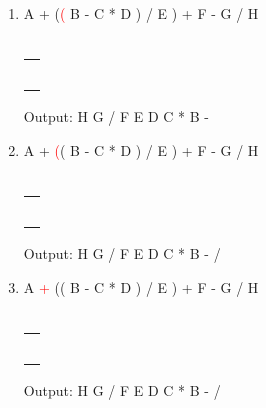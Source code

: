 \documentclass[a4paper]{article}
\begin{document}
\begin{large}
\begin{enumerate}
          \renewcommand{\arraystretch}{1.3} \item
          A + (\textcolor{red}{(} B - C * D ) / E ) + F - G / H\\\\
          \begin{tabular}[t]{ | p{1em} | }
            \makecell{}  \\ \hline
            \makecell{}  \\ \hline
            \makecell{/} \\ \hline
            \makecell{)} \\ \hline
            \makecell{+} \\\hline
            \makecell{-} \\\hline
          \end{tabular}
          \hspace{2em}
          Output: H G / F E D C * B -

          \renewcommand{\arraystretch}{1.3} \item
          A + \textcolor{red}{(}( B - C * D ) / E ) + F - G / H\\\\
          \begin{tabular}[t]{ | p{1em} | }
            \makecell{}  \\ \hline
            \makecell{}  \\ \hline
            \makecell{}  \\ \hline
            \makecell{}  \\ \hline
            \makecell{+} \\\hline
            \makecell{-} \\\hline
          \end{tabular}
          \hspace{2em}
          Output: H G / F E D C * B - /

          \renewcommand{\arraystretch}{1.3} \item
          A \textcolor{red}{+} (( B - C * D ) / E ) + F - G / H\\\\
          \begin{tabular}[t]{ | p{1em} | }
            \makecell{}  \\ \hline
            \makecell{}  \\ \hline
            \makecell{}  \\ \hline
            \makecell{+} \\ \hline
            \makecell{+} \\\hline
            \makecell{-} \\\hline
          \end{tabular}
          \hspace{2em}
          Output: H G / F E D C * B - /


\end{enumerate}
\end{large}
\end{document}
